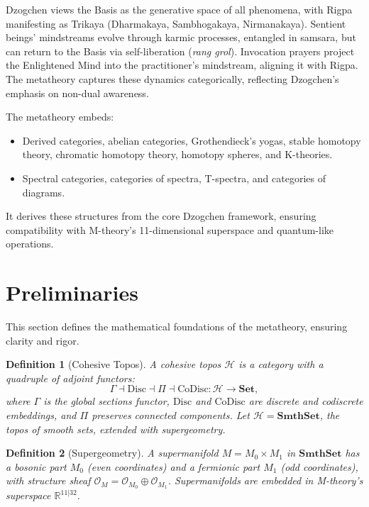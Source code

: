 \documentclass{article}
\newtheorem{definition}{Definition}[section]
\begin{document}
Dzogchen views the Basis as the generative space of all phenomena, with Rigpa manifesting as Trikaya (Dharmakaya, Sambhogakaya, Nirmanakaya). Sentient beings’ mindstreams evolve through karmic processes, entangled in samsara, but can return to the Basis via self-liberation (\textit{rang grol}). Invocation prayers project the Enlightened Mind into the practitioner’s mindstream, aligning it with Rigpa. The metatheory captures these dynamics categorically, reflecting Dzogchen’s emphasis on non-dual awareness.

The metatheory embeds:
\begin{itemize}
    \item Derived categories, abelian categories, Grothendieck’s yogas, stable homotopy theory, chromatic homotopy theory, homotopy spheres, and K-theories.
    \item Spectral categories, categories of spectra, T-spectra, and categories of diagrams.
\end{itemize}
It derives these structures from the core Dzogchen framework, ensuring compatibility with M-theory’s 11-dimensional superspace and quantum-like operations.

\section{Preliminaries}
This section defines the mathematical foundations of the metatheory, ensuring clarity and rigor.

\begin{definition}[Cohesive Topos]
A cohesive topos \(\mathcal{H}\) is a category with a quadruple of adjoint functors:
\[
\Gamma \dashv \text{Disc} \dashv \Pi \dashv \text{CoDisc}: \mathcal{H} \to \mathbf{Set},
\]
where \(\Gamma\) is the global sections functor, \(\text{Disc}\) and \(\text{CoDisc}\) are discrete and codiscrete embeddings, and \(\Pi\) preserves connected components. Let \(\mathcal{H} = \mathbf{SmthSet}\), the topos of smooth sets, extended with supergeometry.
\end{definition}

\begin{definition}[Supergeometry]
A supermanifold \(M = M_0 \times M_1\) in \(\mathbf{SmthSet}\) has a bosonic part \(M_0\) (even coordinates) and a fermionic part \(M_1\) (odd coordinates), with structure sheaf \(\mathcal{O}_M = \mathcal{O}_{M_0} \oplus \mathcal{O}_{M_1}\). Supermanifolds are embedded in M-theory’s superspace \(\mathbb{R}^{11|32}\).
\end{definition}
\end{document}
